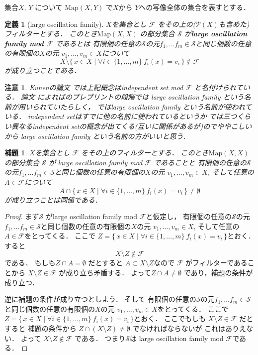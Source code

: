 \documentclass[leqno, a4paper, 12pt]{jsarticle}
\newtheorem{lem}[thm]{補題}
\newtheorem{df}[thm]{定義}
\newtheorem*{rmk}{注意}
\newcommand{\myfil}[1]{\mathcal{#1}}
\newcommand{\myfam}[1]{\mathscr{#1}}
\newcommand{\mymap}[2]{\mathrm{Map}(#1, #2)}
\newcommand{\mypowset}[1]{\mathcal{P}(#1)}
\begin{document}
集合$X$, $Y$
について
$\mymap{X}{Y}$
で$X$から
$Y$への写像全体の集合を表すとする．
\begin{df}[large oscillation family]
$X$を集合とし
$\myfil{F}$
をその上の($\mypowset{X}$も含めた)フィルターとする．
このとき$\mymap{X}{X}$
の部分集合
$\myfam{S}$
が\textbf{large oscillation family mod $\myfil{F}$}
であるとは
有限個の任意の$\myfam{S}$の元$f_{1}, \dots f_{m}\in \myfam{S}$と同じ個数の任意の有限個の$X$の元
$v_{1}, \dots, v_{m}\in X$について
\[
X\setminus \{\, x\in X\mid \forall i\in \{1, \dots, m\} \ f_{i}(x)=v_{i}\, \}\not\in \myfil{F}
\]
が成り立つことである．
\end{df}
\begin{rmk}
Kunenの論文
\cite{kunen}
では上記概念はindependent set mod
 $\myfil{F}$
と名付けられている．
論文\cite{com}
によれば\cite{kunen}のプレプリントの段階では
large oscillation family という名前が用いられていたらしく，
\cite{com}ではlarge oscillation family という名前が使われている．
independent setはすでに他の名前に使われているというか
\cite{kunen}では三つくらい異なるindependent setの概念が出てくる(互いに関係があるが)のでややこしいから
large oscillation family という名前の方がいいと思う．
\end{rmk}

\begin{lem}\label{lem:iikae}
$X$を集合とし
$\myfil{F}$
をその上のフィルターとする．
このとき$\mymap{X}{X}$
の部分集合
$\myfam{S}$
が
large oscillation family mod $\myfil{F}$
であることと
有限個の任意の$\myfam{S}$の元$f_{1}, \dots f_{m}\in \myfam{S}$と同じ個数の任意の有限個の$X$の元
$v_{1}, \dots, v_{m}\in X$, 
そして任意の$A\in \myfil{F}$について
\[
A\cap \{\, x\in X\mid \forall i\in \{1, \dots, m\} \ f_{i}(x)=v_{i}\, \}\neq\emptyset
\]
が成り立つことは同値である．
\end{lem}
\begin{proof}
まず$\myfam{S}$
がlarge oscillation family mod $\myfil{F}$と仮定し，
有限個の任意の$\myfam{S}$の元$f_{1}, \dots f_{m}\in \myfam{S}$と同じ個数の任意の有限個の$X$の元
$v_{1}, \dots, v_{m}\in X$, 
そして任意の$A\in \myfil{F}$をとってくる．
ここで
$Z= \{\, x\in X\mid \forall i\in \{1, \dots, m\} \ f_{i}(x)=v_{i}\, \}$とおく．
すると
\[
X\setminus Z\not\in \myfil{F}
\]
である．
もしも$Z\cap A=\emptyset$
だとすると
$A\subset X\setminus Z$なので
$\myfil{F}$
がフィルターであることから
$X\setminus Z\in \myfil{F}$
が成り立ち矛盾する．
よって$Z\cap A\neq \emptyset$
であり，補題の条件が成り立つ．

逆に補題の条件が成り立つとしよう．
そして
有限個の任意の$\myfam{S}$の元$f_{1}, \dots f_{m}\in \myfam{S}$と同じ個数の任意の有限個の$X$の元
$v_{1}, \dots, v_{m}\in X$をとってくる．
ここで
$Z= \{\, x\in X\mid \forall i\in \{1, \dots, m\} \ f_{i}(x)=v_{i}\, \}$とおく．
ここでもしも
$X\setminus Z\in \myfil{F}$
だとすると
補題の条件から
$Z\cap (X\setminus Z)\neq \emptyset$
でなければならないが
これはありえない．
よって
$X\setminus Z\not\in \myfil{F}$
である．
つまり$\myfam{S}$は
large oscillation family mod $\myfil{F}$である．
\end{proof}
\end{document}
